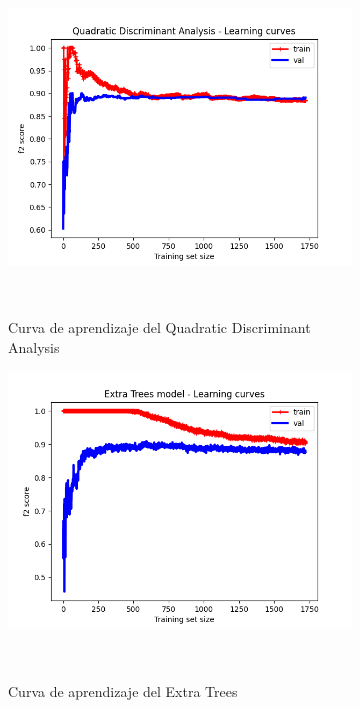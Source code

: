 \begin{figure}[!ht]
\begin{subfigure}[b]{0.3\textwidth}
        \includegraphics[width=\linewidth]{media/images/learning-curves/qda.png}
        \caption{Curva de aprendizaje del Quadratic Discriminant Analysis}\ \label{sfig:lc-qda}
    \end{subfigure}
    \begin{subfigure}[b]{0.3\textwidth}
        \includegraphics[width=\linewidth]{media/images/learning-curves/et.png}
        \caption{Curva de aprendizaje del Extra Trees}\ \label{sfig:lc-et}
    \end{subfigure}
    \begin{subfigure}[b]{0.3\textwidth}

\end{subfigure}
\end{figure}
